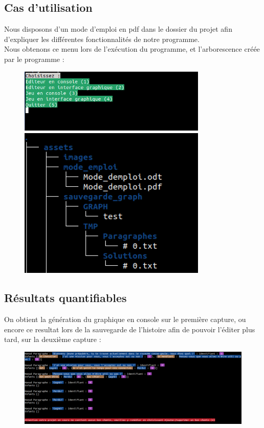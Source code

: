 \documentclass[12pt]{article}
\begin{document}
\subsection{Cas d'utilisation}
Nous disposons d'un mode d'emploi en pdf dans le dossier du projet afin d'expliquer les différentes fonctionnalités de notre programme.\medskip
\\
\noindent
Nous obtenons ce menu lors de l'exécution du programme, et l'arborescence créée par le programme :
\begin{figure}[h]
  \centering
    \includegraphics[width=0.8\textwidth]{Menu}
    \includegraphics[width=0.8\textwidth]{Tree3}
\end{figure}

\clearpage
\subsection{Résultats quantifiables}
On obtient la génération du graphique en console sur le première capture, ou encore ce resultat lors de la sauvegarde de l'histoire afin de pouvoir l'éditer plus tard, sur la deuxième capture :\\
\begin{figure}[h]
  \centering
    \includegraphics[width=1\textwidth]{Graph}
\end{figure}
\end{document}
